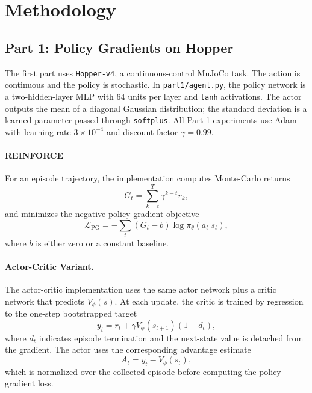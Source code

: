 \section{Methodology}
\subsection{Part 1: Policy Gradients on Hopper}
The first part uses \texttt{Hopper-v4}, a continuous-control MuJoCo task. The action is continuous and the policy is stochastic. In \texttt{part1/agent.py}, the policy network is a two-hidden-layer MLP with 64 units per layer and \texttt{tanh} activations. The actor outputs the mean of a diagonal Gaussian distribution; the standard deviation is a learned parameter passed through \texttt{softplus}. All Part 1 experiments use Adam with learning rate $3 \times 10^{-4}$ and discount factor $\gamma=0.99$.

\paragraph{REINFORCE}
For an episode trajectory, the implementation computes Monte-Carlo returns
\begin{equation}
G_t = \sum_{k=t}^{T} \gamma^{k-t} r_k ,
\end{equation}
and minimizes the negative policy-gradient objective
\begin{equation}
\mathcal{L}_{\mathrm{PG}} = - \sum_t (G_t-b)\log \pi_\theta(a_t|s_t),
\end{equation}
where $b$ is either zero or a constant baseline. 

\paragraph{Actor-Critic Variant.}
The actor-critic implementation uses the same actor network plus a critic network that predicts $V_\phi(s)$. At each update, the critic is trained by regression to the one-step bootstrapped target
\begin{equation}
y_t = r_t + \gamma V_\phi(s_{t+1})(1-d_t),
\end{equation}
where $d_t$ indicates episode termination and the next-state value is detached from the gradient. The actor uses the corresponding advantage estimate
\begin{equation}
A_t = y_t - V_\phi(s_t),
\end{equation}
which is normalized over the collected episode before computing the policy-gradient loss. 

